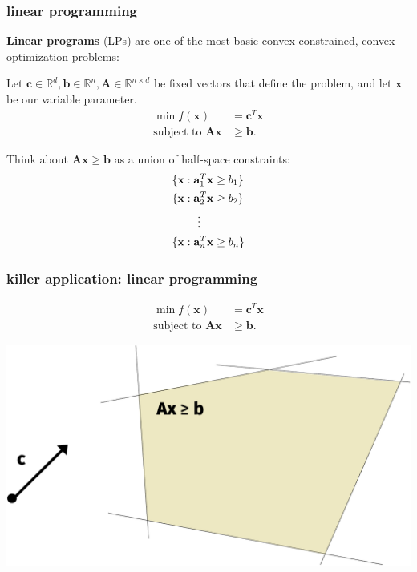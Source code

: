 \documentclass[compress]{beamer}
\newcommand{\bv}[1]{\mathbf{#1}}
\newcommand{\R}{\mathbb{R}}
\begin{document}
\begin{frame}[t]
	\frametitle{linear programming}
	\textbf{Linear programs} (LPs) are one of the most basic convex constrained, convex optimization problems:
	
	Let $\bv{c}\in \R^d, \bv{b}\in \R^n, \bv{A}\in \R^{n\times d}$ be fixed vectors that define the problem, and let $\bv{x}$ be our variable parameter.
	\begin{align*}
	\min f(\bv{x}) &= \bv{c}^T\bv{x}\\
	\text{subject to } \bv{A}\bv{x} &\geq \bv{b}.
	\end{align*}
	
Think about $\bv{A}\bv{x} \geq \bv{b}$ as a union of half-space constraints:
\begin{align*}
	&\{\bv{x}: \bv{a}_1^T\bv{x} \geq {b}_1 \}\\
		&\{\bv{x}: \bv{a}_2^T\bv{x} \geq {b}_2 \}\\
			&\hspace{2.3em}\vdots\\
			&\{\bv{x}: \bv{a}_n^T\bv{x} \geq {b}_n \}
\end{align*}
	
\end{frame}

\begin{frame}[t]
	\frametitle{killer application: linear programming}
	\begin{align*}
		\min f(\bv{x}) &= \bv{c}^T\bv{x}\\
		\text{subject to } \bv{A}\bv{x} &\geq \bv{b}.
	\end{align*}
	
	\begin{center}
		\includegraphics[width=.8\textwidth]{lpexample.png}
	\end{center}
\end{frame}
\end{document}

